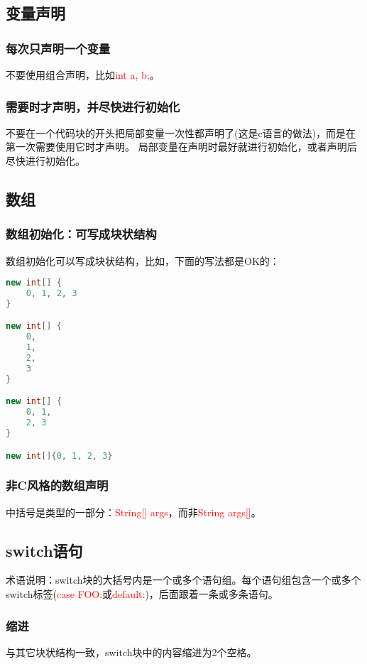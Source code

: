 \documentclass[cn,11pt,chinese]{elegantbook}
\begin{document}
\subsection{变量声明}
\subsubsection{每次只声明一个变量}
不要使用组合声明，比如\textcolor{red}{int a, b;}。

\subsubsection{需要时才声明，并尽快进行初始化}
不要在一个代码块的开头把局部变量一次性都声明了(这是c语言的做法)，而是在第一次需要使用它时才声明。 局部变量在声明时最好就进行初始化，或者声明后尽快进行初始化。

\subsection{数组}
\subsubsection{数组初始化：可写成块状结构}
数组初始化可以写成块状结构，比如，下面的写法都是OK的：
\begin{lstlisting}[language=java]
new int[] {
	0, 1, 2, 3 
}

new int[] {
	0,
	1,
	2,
	3
}

new int[] {
	0, 1,
	2, 3
}

new int[]{0, 1, 2, 3}
\end{lstlisting}

\subsubsection{非C风格的数组声明}
中括号是类型的一部分：\textcolor{red}{String[] args}，而非\textcolor{red}{String args[]}。

\subsection{switch语句}
术语说明：switch块的大括号内是一个或多个语句组。每个语句组包含一个或多个switch标签(\textcolor{red}{case FOO:}或\textcolor{red}{default:})，后面跟着一条或多条语句。

\subsubsection{缩进}
与其它块状结构一致，switch块中的内容缩进为2个空格。
\end{document}
